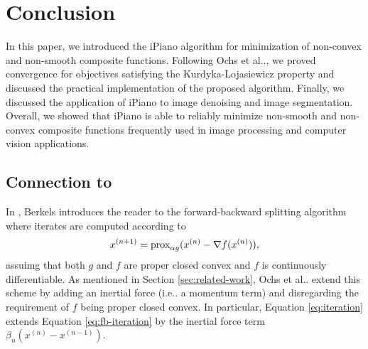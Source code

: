 \documentclass[onecolumn,final,a4paper,13pt,reqno]{siamart}
\makeatletter
\newcommand{\rpm}{\raisebox{.2ex}{$\scriptstyle\pm$}}
\DeclareRobustCommand\onedot{\futurelet\@let@token\@onedot}
\def\@onedot{\ifx\@let@token.\else.\null\fi\xspace}
\def\ie{{i.e}\onedot} \def\Ie{{I.e}\onedot}
\def\etal{{et al}\onedot}
\DeclareRobustCommand{\prox}[1]{%
    \ifmmode
        \text{prox}_{#1}
    \else
        $\text{prox}_{#1}$
    \fi
}
\makeatother
\begin{document}

\section{Conclusion}
\label{sec:conclusion}

In this paper, we introduced the iPiano algorithm for minimization of non-convex and non-smooth composite functions. Following Ochs \etal \cite{OchsChenBroxPock:2013}, we proved convergence for objectives satisfying the Kurdyka-Lojasiewicz property \cite{Lojasiewicz:1993,Kurdyka:1998} and discussed the practical implementation of the proposed algorithm. Finally, we discussed the application of iPiano to image denoising and image segmentation. Overall, we showed that iPiano is able to reliably minimize non-smooth and non-convex composite functions frequently used in image processing and computer vision applications.

\subsection{Connection to \cite{Berkels:2015}}

In \cite[Bem. 4.12]{Berkels:2015}, Berkels introduces the reader to the forward-backward splitting algorithm where iterates are computed according to
\begin{align}
	x^{(n + 1)} = \prox{\alpha g}(x^{(n)} - \nabla f(x^{(n)})),\label{eq:fb-iteration}
\end{align}
assuimg that both $g$ and $f$ are proper closed convex and $f$ is continuously differentiable. As mentioned in Section \ref{sec:related-work}, Ochs \etal extend this scheme by adding an inertial force (\ie a momentum term) and disregarding the requirement of $f$ being proper closed convex. In particular, Equation \eqref{eq:iteration} extends Equation \eqref{eq:fb-iteration} by the inertial force term $\beta_n(x^{(n)} - x^{(n - 1)})$.



\end{document}

